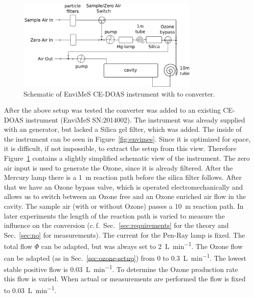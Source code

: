 \begin{figure}[htbp]
  \centering
  \includegraphics[width=0.8\textwidth]{images/envimes_setup.png}
  \caption{Schematic of EnviMeS CE-DOAS instrument with  to
     converter.}
  \label{fig:envimes-schematic}
\end{figure}

After the above setup was tested the converter was added to an
existing CE-DOAS instrument (EnviMeS SN:2014002).  The instrument was
already supplied with an  generator, but lacked a Silica gel
filter, which was added. The inside of the instrument can be seen in
Figure~\ref{fig:envimes}. Since it is optimized for space, it is
difficult, if not impossible, to extract the setup from this
view. Therefore Figure~\ref{fig:envimes-schematic} contains a slightly
simplified schematic view of the instrument. The zero air
input is used to generate the
Ozone, since it is already filtered. After the Mercury lamp there is a
\SI{1}{\meter} reaction path before the silica filter follows. After
that we have an Ozone bypass valve, which is operated
electromechanically and allows us to switch between an Ozone free and
an Ozone enriched air flow in the cavity. The sample air (with or
without Ozone) passes a \SI{10}{\meter} reaction path. In later
experiments the length of the reaction path is varied to measure the
influence on the  conversion (c.\,f.\
Sec.~\ref{sec:requirements} for the theory and Sec.~\ref{sec:no} for
measurements). The current for the Pen-Ray lamp is fixed. The total
flow $\Phi$ can be adapted, but was always set to
\SI{2}{\liter\per\minute}. The Ozone flow can be adapted (as in
Sec.~\ref{sec:ozone-setup}) from 0 to \SI{0.3}{\liter\per\minute}. The
lowest stable positive flow is \SI{0.03}{\liter\per\minute}. To
determine the Ozone production rate this flow is varied. When actual
\ch{NO} or \ch{NO_x}\todo{define NOx somewhere} measurements are
performed the flow is fixed to \SI{0.03}{\liter\per\minute}.

